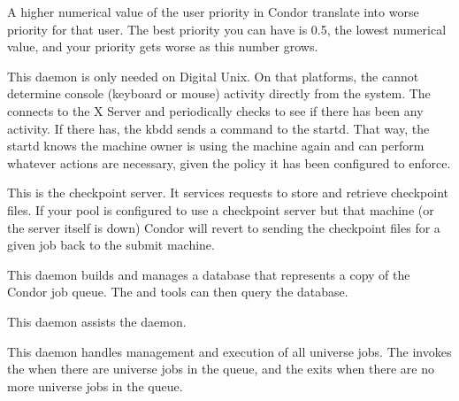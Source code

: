 \begin{description}
\Note A higher numerical value of the user priority in Condor
translate into worse priority for that user.  The best priority you
can have is 0.5, the lowest numerical value, and your priority gets
worse as this number grows.

\item[\Condor{kbdd}] This daemon
is only needed on Digital Unix.
On that platforms, the  cannot determine
console (keyboard or mouse) activity directly from the system.  The
 connects to the X Server and periodically checks to see
if there has been any activity.  If there has, the kbdd sends a
command to the startd.  That way, the startd knows the machine owner
is using the machine again and can perform whatever actions are
necessary, given the policy it has been configured to enforce.

\item[\Condor{ckpt\_server}] This is the checkpoint server.
It services requests to store and retrieve checkpoint files.  If your
pool is configured to use a checkpoint server but that machine (or the
server itself is down) Condor will revert to sending the checkpoint
files for a given job back to the submit machine.

\item[\Condor{quill}] This daemon
builds and manages a database that represents a copy of the 
Condor job queue.
The  and  tools can then query the database.

\item[\Condor{dbmsd}] This daemon
assists the  daemon.

\item[\Condor{gridmanager}] This daemon
handles management and execution of all 
universe jobs.
The  invokes the  when
there are  universe jobs in the queue,
and the  exits when there are no more
 universe jobs in the queue.


\end{description}
